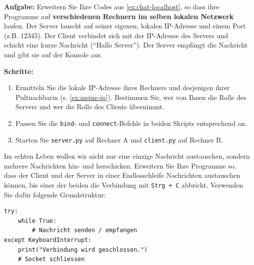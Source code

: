 \begin{myexercise}\label{ex:chat-localnet}

    \textbf{Aufgabe:} Erweitern Sie Ihre Codes aus \cref{ex:chat-localhost}, so dass ihre Programme auf \textbf{verschiedenen Rechnern im selben lokalen Netzwerk} laufen. Der Server lauscht auf seiner eigenen, lokalen \gls{IP}-Adresse und einem Port (z.B. 12345). Der Client verbindet sich mit der \gls{IP}-Adresse des Servers und schickt eine kurze Nachricht (\enquote{Hallo Server}). Der Server empfängt die Nachricht und gibt sie auf der Konsole aus.

    \textbf{Schritte:}
    \begin{enumerate}
        \item Ermitteln Sie die lokale \gls{IP}-Adresse ihres Rechners und desjenigen ihrer Pultnachbarin (s. \cref{ex:meine-ip}). Bestimmen Sie, wer von Ihnen die Rolle des Servers und wer die Rolle des Clients übernimmt.
        \item Passen Sie die \texttt{bind}- und \texttt{connect}-Befehle in beiden Skripts entsprechend an.
        \item Starten Sie \texttt{server.py} auf Rechner A und \texttt{client.py} auf Rechner B.
    \end{enumerate}


\end{myexercise}

\begin{myexercise}\label{ex:endlos-chat}
    Im echten Leben wollen wir nicht nur eine einzige Nachricht austauschen, sondern mehrere Nachrichten hin- und herschicken. Erweitern Sie Ihre Programme so, dass der Client und der Server in einer Endlosschleife Nachrichten austauschen können, bis einer der beiden die Verbindung mit \texttt{Strg + C} abbricht. Verwenden Sie dafür folgende Grundstruktur:
    \begin{lstlisting}
try:
    while True:
        # Nachricht senden / empfangen
except KeyboardInterrupt:
    print("Verbindung wird geschlossen.")
    # Socket schliessen
\end{lstlisting}
\end{myexercise}

